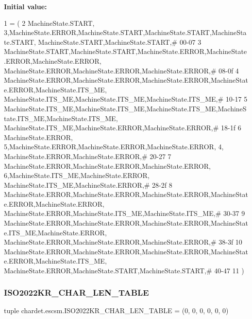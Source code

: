 {\bfseries Initial value\+:}
\begin{DoxyCode}
1 =  (
2 MachineState.START,     3,MachineState.ERROR,MachineState.START,MachineState.START,MachineState.START,
      MachineState.START,MachineState.START,\textcolor{comment}{# 00-07}
3 MachineState.START,MachineState.START,MachineState.ERROR,MachineState.ERROR,MachineState.ERROR,
      MachineState.ERROR,MachineState.ERROR,MachineState.ERROR,\textcolor{comment}{# 08-0f}
4 MachineState.ERROR,MachineState.ERROR,MachineState.ERROR,MachineState.ERROR,MachineState.ITS\_ME,
      MachineState.ITS\_ME,MachineState.ITS\_ME,MachineState.ITS\_ME,\textcolor{comment}{# 10-17}
5 MachineState.ITS\_ME,MachineState.ITS\_ME,MachineState.ITS\_ME,MachineState.ITS\_ME,MachineState.ITS\_ME,
      MachineState.ITS\_ME,MachineState.ERROR,MachineState.ERROR,\textcolor{comment}{# 18-1f}
6 MachineState.ERROR,     5,MachineState.ERROR,MachineState.ERROR,MachineState.ERROR,     4,
      MachineState.ERROR,MachineState.ERROR,\textcolor{comment}{# 20-27}
7 MachineState.ERROR,MachineState.ERROR,MachineState.ERROR,     6,MachineState.ITS\_ME,MachineState.ERROR,
      MachineState.ITS\_ME,MachineState.ERROR,\textcolor{comment}{# 28-2f}
8 MachineState.ERROR,MachineState.ERROR,MachineState.ERROR,MachineState.ERROR,MachineState.ERROR,
      MachineState.ERROR,MachineState.ITS\_ME,MachineState.ITS\_ME,\textcolor{comment}{# 30-37}
9 MachineState.ERROR,MachineState.ERROR,MachineState.ERROR,MachineState.ITS\_ME,MachineState.ERROR,
      MachineState.ERROR,MachineState.ERROR,MachineState.ERROR,\textcolor{comment}{# 38-3f}
10 MachineState.ERROR,MachineState.ERROR,MachineState.ERROR,MachineState.ERROR,MachineState.ITS\_ME,
      MachineState.ERROR,MachineState.START,MachineState.START,\textcolor{comment}{# 40-47}
11 )
\end{DoxyCode}
\mbox{\label{namespacechardet_1_1escsm_a0f1c21e9f0b3e01d9f5e71afbcf1199c}} 
\subsubsection{\texorpdfstring{I\+S\+O2022\+K\+R\+\_\+\+C\+H\+A\+R\+\_\+\+L\+E\+N\+\_\+\+T\+A\+B\+LE}{ISO2022KR\_CHAR\_LEN\_TABLE}}
{\footnotesize\ttfamily tuple chardet.\+escsm.\+I\+S\+O2022\+K\+R\+\_\+\+C\+H\+A\+R\+\_\+\+L\+E\+N\+\_\+\+T\+A\+B\+LE = (0, 0, 0, 0, 0, 0)}

